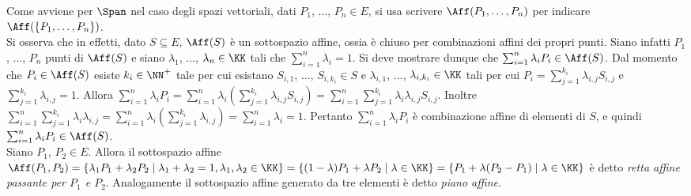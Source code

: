 \documentclass[11pt]{article}
\begin{document}
	\begin{remark}\nl
		\li Come avviene per $\Span$ nel caso degli spazi vettoriali, dati $P_1$, ..., $P_n \in E$, si usa scrivere $\Aff(P_1, \ldots, P_n)$
		per indicare $\Aff(\{P_1, \ldots, P_n\})$. \\
		
		\li Si osserva che in effetti, dato $S \subseteq E$, $\Aff(S)$ è un sottospazio affine, ossia è
		chiuso per combinazioni affini dei propri punti. Siano infatti $P_1$, ..., $P_n$ punti di $\Aff(S)$
		e siano $\lambda_1$, ..., $\lambda_n \in \KK$ tali che $\sum_{i=1}^n \lambda_i = 1$. Si deve
		mostrare dunque che $\sum_{i=1}^n \lambda_i P_i \in \Aff(S)$. Dal momento che $P_i \in \Aff(S)$ esiste $k_i \in \NN^+$ tale per cui esistano
		$S_{i,1}$, ..., $S_{i,k_i} \in S$ e $\lambda_{i,1}$, ..., $\lambda_{i,k_i} \in \KK$ tali per cui
		$P_i = \sum_{j=1}^{k_i} \lambda_{i,j} S_{i,j}$ e $\sum_{j=1}^{k_i} \lambda_{i,j} = 1$. Allora
		$\sum_{i=1}^n \lambda_i P_i = \sum_{i=1}^n \lambda_i (\sum_{j=1}^{k_i} \lambda_{i,j} S_{i,j}) =
		\sum_{i=1}^n \sum_{j=1}^{k_i} \lambda_i \lambda_{i,j} S_{i,j}$. Inoltre $\sum_{i=1}^n \sum_{j=1}^{k_i} \lambda_i \lambda_{i,j} = \sum_{i=1}^n \lambda_i (\sum_{j=1}^{k_i}  \lambda_{i,j}) = \sum_{i=1}^n \lambda_i = 1$.
		Pertanto $\sum_{i=1}^n \lambda_i P_i$ è combinazione affine di elementi di $S$, e quindi $\sum_{i=1}^n \lambda_i P_i \in \Aff(S)$. \\
		
		\li Siano $P_1$, $P_2 \in E$. Allora il sottospazio affine $\Aff(P_1, P_2) = \{ \lambda_1 P_1 + \lambda_2 P_2 \mid \lambda_1 + \lambda_2 = 1, \lambda_1, \lambda_2 \in \KK \} = \{ (1-\lambda) P_1 + \lambda P_2 \mid \lambda \in \KK \} = \{ P_1 + \lambda (P_2 - P_1) \mid \lambda \in \KK \}$ è detto \textit{retta affine passante per $P_1$ e $P_2$}. Analogamente il sottospazio affine generato da tre elementi è detto \textit{piano affine}.
	\end{remark}
\end{document}
